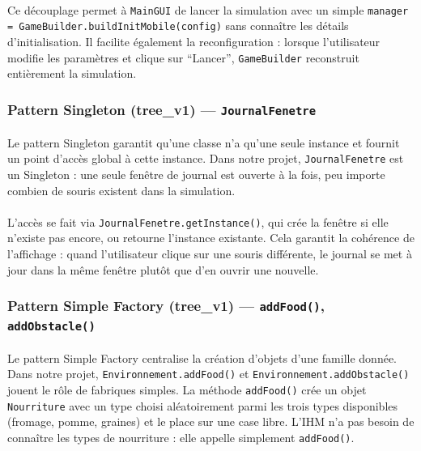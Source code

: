 \paragraph{} Ce découplage permet à \texttt{MainGUI} de lancer la simulation avec un simple \texttt{manager = GameBuilder.buildInitMobile(config)} sans connaître les détails d'initialisation. Il facilite également la reconfiguration : lorsque l'utilisateur modifie les paramètres et clique sur ``Lancer'', \texttt{GameBuilder} reconstruit entièrement la simulation.

\subsubsection{Pattern Singleton (tree\_v1) --- \texttt{JournalFenetre}}

\paragraph{} Le pattern Singleton garantit qu'une classe n'a qu'une seule instance et fournit un point d'accès global à cette instance. Dans notre projet, \texttt{JournalFenetre} est un Singleton : une seule fenêtre de journal est ouverte à la fois, peu importe combien de souris existent dans la simulation.

\paragraph{} L'accès se fait via \texttt{JournalFenetre.getInstance()}, qui crée la fenêtre si elle n'existe pas encore, ou retourne l'instance existante. Cela garantit la cohérence de l'affichage : quand l'utilisateur clique sur une souris différente, le journal se met à jour dans la même fenêtre plutôt que d'en ouvrir une nouvelle.

\subsubsection{Pattern Simple Factory (tree\_v1) --- \texttt{addFood()}, \texttt{addObstacle()}}

\paragraph{} Le pattern Simple Factory centralise la création d'objets d'une famille donnée. Dans notre projet, \texttt{Environnement.addFood()} et \texttt{Environnement.addObstacle()} jouent le rôle de fabriques simples. La méthode \texttt{addFood()} crée un objet \texttt{Nourriture} avec un type choisi aléatoirement parmi les trois types disponibles (fromage, pomme, graines) et le place sur une case libre. L'IHM n'a pas besoin de connaître les types de nourriture : elle appelle simplement \texttt{addFood()}.

